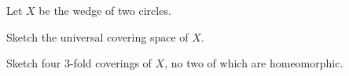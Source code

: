 Let $X$ be the wedge of two circles.
\begin{alist}
\item Sketch the universal covering space of $X$.
\item Sketch four $3$-fold coverings of $X$, no two of which are
homeomorphic.
\end{alist}
